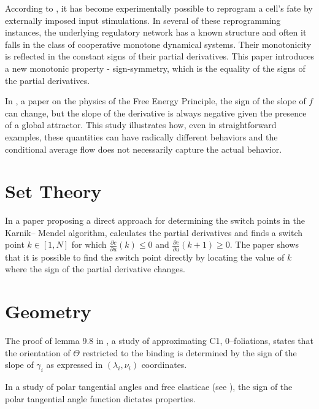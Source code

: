 \documentclass[11pt]{book}
\begin{document}
According to \cite{shah2018reprogramming}, it has become experimentally possible to \textquotedbl reprogram\textquotedbl{}
a cell's fate by externally imposed input stimulations. In
several of these reprogramming instances, the underlying regulatory
network has a known structure and often it falls in the class of
cooperative monotone dynamical systems. Their monotonicity is reflected
in the constant signs of their partial derivatives. This paper introduces a new monotonic
property - sign-symmetry, which is the
equality of the signs of the partial derivatives.

In \cite{aguilera2021particular}, a paper on the physics of the Free Energy Principle, the sign of the slope of $f$ can
change, but the slope of the derivative is always negative given
the presence of a global attractor. This study illustrates how, even in straightforward
examples, these quantities can have radically different behaviors
and the conditional average flow does not necessarily capture
the actual behavior.


\section{Set Theory}

In a paper proposing a direct approach for determining the switch points in the Karnik–
Mendel algorithm, \cite{chen2017direct} calculates
the partial derivatives and finds a switch point $k\in\left[1,N\right]$
for which $\frac{\partial c}{\partial u}(k)\leq0$ and $\frac{\partial c}{\partial u}\left(k+1\right)\geq0$.
The paper shows that it is possible to find the switch point directly by locating the value
of $k$ where the sign of the partial derivative changes.


\section{Geometry}

The proof of lemma 9.8 in \cite{kazez2015approximating}, a study of approximating C1, 0–foliations, states that
the orientation of $\Theta$ restricted to the binding is determined
by the sign of the slope of $\gamma_{i}$ as expressed in $\left(\lambda_{i},\nu_{i}\right)$
coordinates.

In a study of polar tangential angles and free elasticae (see \cite{miura2020polar}), the sign of the polar tangential angle function dictates properties.
\end{document}
